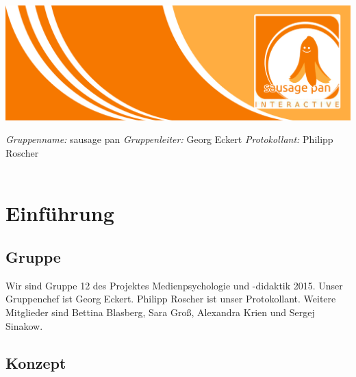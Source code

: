\documentclass[10pt,a4paper,notitlepage]{report}
\author{Sausage Pan}
\begin{document}
	\newcommand{\Eins}[1]{\color{orange}\textbf{{\Large#1}}} %
	\newcommand{\Zwei}[1]{\color{orange}\textbf{{\large#1}}} %
	\newcommand{\Drei}[1]{\color{orange}{\normalsize#1}} %
	\newcommand{\Text}{\color{schwarz}} %
	\newcommand{\Fusszeile}
	{\textit{{\footnotesize Eckert, Georg - Roscher, Philipp - Krien, Alexandra - Sinakow, Sergej - Blasberg, Bettina - Groß, Stephanie Sara}}} %
	\marginpar{\vspace{3.0mm} \color{orange}\rule{0.8mm}{53.3mm} \\[3mm] \color{hellorange}\rule{0.8mm}{170mm}}
	\begin{center}
		\includegraphics[width=160mm]{header2}
	\end{center}
	\color{orange} \textit{Gruppenname:} \color{schwarz}sausage pan \color{orange} \textit{Gruppenleiter:} \color{schwarz}Georg Eckert   \color{orange} \textit{Protokollant:} \color{schwarz}Philipp Roscher\\
	\\
	\tableofcontents
	\clearpage
	\chapter{Einführung}
	\section{Gruppe}
	Wir sind Gruppe 12 des Projektes Medienpsychologie und -didaktik 2015. Unser Gruppenchef ist Georg Eckert. 
	Philipp Roscher ist unser Protokollant. Weitere Mitglieder sind Bettina Blasberg, Sara Groß, Alexandra Krien und Sergej 				Sinakow.

	\section{Konzept}
\end{document}
